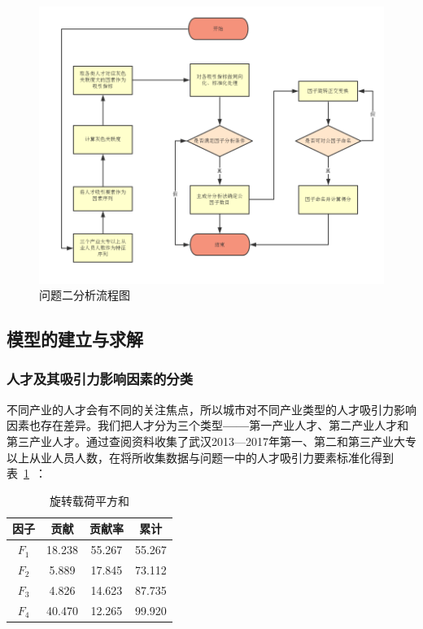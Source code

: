 \documentclass{whutmod}
\begin{document}
	\begin{figure}[H]
	\centering
	\includegraphics[width=\textwidth]{figures/2222.png}
	\caption{问题二分析流程图}\label{2222}
	\end{figure}



	\subsection{模型的建立与求解}

	\subsubsection{人才及其吸引力影响因素的分类}
	不同产业的人才会有不同的关注焦点，所以城市对不同产业类型的人才吸引力影响因素也存在差异。我们把人才分为三个类型\textbf{——}第一产业人才、第二产业人才和第三产业人才。通过查阅资料收集了武汉2013—2017年第一、第二和第三产业大专以上从业人员人数，在将所收集数据与问题一中的人才吸引力要素标准化得到表~\ref{hhh}~：
	\begin{table}[H]
		\centering
		\caption{旋转载荷平方和}\label{hhh}
		\begin{tabular}{cccc}
			\toprule[2pt]
			\multicolumn{1}{m{2cm}}{\centering 因子}&
			\multicolumn{1}{m{2cm}}{\centering 贡献} & \multicolumn{1}{m{2cm}}{\centering 贡献率} & \multicolumn{1}{m{2cm}}{\centering 累计}\\
			\midrule[1pt]
			$F_{1}$	 &  18.238 & 55.267&55.267\\ 
			$F_{2}$ &  5.889 & 17.845&73.112\\ 
			$F_{3}$	 &  4.826 &14.623&87.735\\ 
			$F_{4}$  &  40.470& 12.265&99.920\\ 
			\bottomrule[2pt]
		\end{tabular}
	\end{table}
\end{document}
